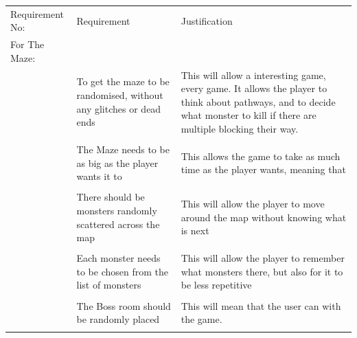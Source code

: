 \documentclass[12pt]{article}
\begin{document}
\begin{tabularx}{\linewidth}{XXX}
Requirement No:         & Requirement                                                                                        & Justification                                                                                                                                                                                                                                      \\
For The Maze:           &                                                                                                    &                                                                                                                                                                                                                                                    \\
                        & To get the maze to be randomised, without any glitches or dead ends                                & This will allow a interesting game, every game. It allows the player to think about pathways, and to decide what monster to kill if there are multiple blocking their way.
                        \\
                        \\
                        & The Maze needs to be as big as the player wants it to                                              & This allows the game to take as much time as the player wants, meaning that
                        \\
                         \\
                        & There should be monsters randomly scattered across the map                                         & This will allow the player to move around the map without knowing what is next
                        \\
		     \\
                        & Each monster needs to be chosen from the list of monsters                                          & This will allow the player to remember what monsters there, but also for it to be less repetitive                                                                                                                                                  		     \\
                        \\
                        & The Boss room should be randomly placed                                                            & This will mean that the user can with the game.                                                                                                                                                                                                   \\ \\

\end{tabularx}
\end{document}
